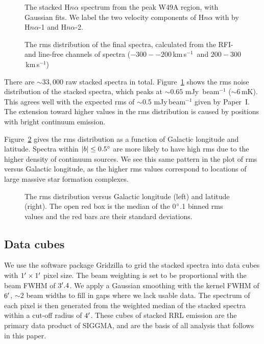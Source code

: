 \documentclass[manuscript]{aastex61}
\newcommand{\kms}{\,km\,s$^{-1}$}
\begin{document}
\begin{figure}%
\begin{minipage}{.48\textwidth}
\centering
{}
\caption{The stacked H$n\alpha$ spectrum from the peak W49A region, with Gaussian fits.
We label the two velocity components of H$n\alpha$ with by H$n\alpha$-1 and H$n\alpha$-2.
}\label{fig_spec}
\end{minipage}
\hfill
\begin{minipage}{.48\textwidth}
\centering
{}
\caption{The rms distribution of the final spectra, calculated from the RFI- and line-free channels of spectra ($-300 - -200$\kms\ and $200 - 300$\kms)
}\label{fig_rms}
\end{minipage}
\end{figure}

There are $\sim33,000$ raw stacked spectra in total.
Figure~\ref{fig_rms} shows the rms noise distribution of the stacked spectra, which peaks at $\sim0.65$ mJy\, beam$^{-1}$ ($\sim6$\,mK). 
This agrees well with the expected rms of $\sim0.5$ mJy\,beam$^{-1}$ given by Paper~I. 
The extension toward higher values in the rms distribution is caused by positions with bright continuum emission.

Figure~\ref{fig_rms_glat} gives the rms distribution as a function of Galactic longitude and latitude.
Spectra within $|b| \leq 0.5\mbox{$^\circ$}$ are more likely to have high rms due to the higher density of continuum sources.
We see this same pattern in the plot of rms versus Galactic longitude, as the higher rms values correspond to locations of large massive star formation complexes.

\begin{figure}[htbp]
\caption{The rms distribution versus Galactic longitude (left) and latitude (right).
The open red box is the median of the 0$\mbox{$^\circ$}$.1 binned rms values and the red bars are their standard deviations.
}\label{fig_rms_glat}
\end{figure}

\subsection{Data cubes} \label{sec_cube}
We use the software package Gridzilla \citep{Barnes2001} to grid the stacked spectra into data cubes with $1\mbox{$^\prime$} \times 1\mbox{$^\prime$}$ pixel size.
The beam weighting is set to be proportional with the beam FWHM of $3\mbox{$^\prime$}.4$.
We apply a Gaussian smoothing with the kernel FWHM of $6\mbox{$^\prime$}$, $\sim2$ beam widths to fill in gaps where we lack usable data.
The spectrum of each pixel is then generated from the weighted median of the stacked spectra within a cut-off radius of $4\mbox{$^\prime$}$.
These cubes of stacked RRL emission are the primary data product of SIGGMA, and are the basis of all analysis that follows in this paper.
\end{document}
